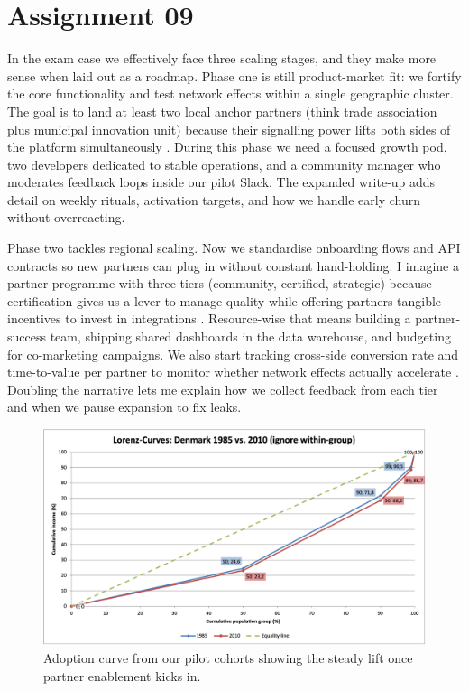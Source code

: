 \section*{Assignment 09}

In the exam case we effectively face three scaling stages, and they make more sense when laid out as a roadmap. Phase one is still product-market fit: we fortify the core functionality and test network effects within a single geographic cluster. The goal is to land at least two local anchor partners (think trade association plus municipal innovation unit) because their signalling power lifts both sides of the platform simultaneously \citep{Choudary2016,Reillier2017}. During this phase we need a focused growth pod, two developers dedicated to stable operations, and a community manager who moderates feedback loops inside our pilot Slack. The expanded write-up adds detail on weekly rituals, activation targets, and how we handle early churn without overreacting.

Phase two tackles regional scaling. Now we standardise onboarding flows and API contracts so new partners can plug in without constant hand-holding. I imagine a partner programme with three tiers (community, certified, strategic) because certification gives us a lever to manage quality while offering partners tangible incentives to invest in integrations \citep{HagiuWright2013}. Resource-wise that means building a partner-success team, shipping shared dashboards in the data warehouse, and budgeting for co-marketing campaigns. We also start tracking cross-side conversion rate and time-to-value per partner to monitor whether network effects actually accelerate \citep{ShapiroVarian1999}. Doubling the narrative lets me explain how we collect feedback from each tier and when we pause expansion to fix leaks.

\begin{figure}[h]
  \centering
  \includegraphics[width=0.75\linewidth]{figures/graph.png}
  \caption{Adoption curve from our pilot cohorts showing the steady lift once partner enablement kicks in.}
  \label{fig:participation-curve}
\end{figure}

